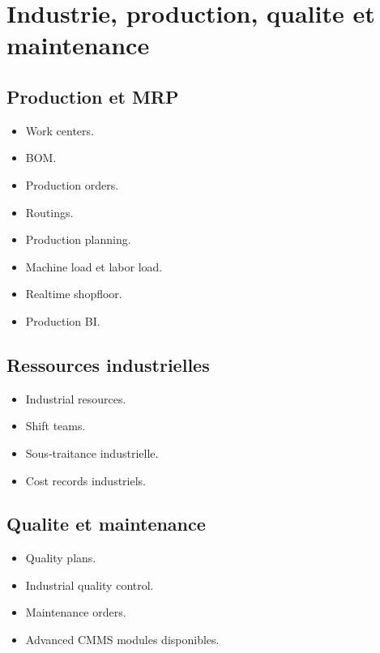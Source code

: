 \documentclass[11pt,a4paper]{article}
\begin{document}
\section{Industrie, production, qualite et maintenance}
\subsection{Production et MRP}
\begin{itemize}[leftmargin=1.2cm]
    \item Work centers.
    \item BOM.
    \item Production orders.
    \item Routings.
    \item Production planning.
    \item Machine load et labor load.
    \item Realtime shopfloor.
    \item Production BI.
\end{itemize}

\subsection{Ressources industrielles}
\begin{itemize}[leftmargin=1.2cm]
    \item Industrial resources.
    \item Shift teams.
    \item Sous-traitance industrielle.
    \item Cost records industriels.
\end{itemize}

\subsection{Qualite et maintenance}
\begin{itemize}[leftmargin=1.2cm]
    \item Quality plans.
    \item Industrial quality control.
    \item Maintenance orders.
    \item Advanced CMMS modules disponibles.
\end{itemize}
\end{document}
